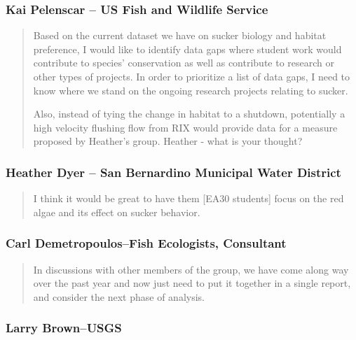 \documentclass{article}\usepackage[]{graphicx}\usepackage[]{color}
\begin{document}
\subsubsection{Kai Pelenscar -- US Fish and Wildlife Service}

\begin{quote}
Based on the current dataset we have on sucker biology and habitat preference, I would like to identify data gaps where student work would contribute to species' conservation as well as contribute to research or other types of projects. In order to prioritize a list of data gaps, I need to know where we stand on the ongoing research projects relating to sucker.

Also, instead of tying the change in habitat to a shutdown, potentially a high velocity flushing flow from RIX would provide data for a measure proposed by Heather's group. Heather - what is your thought? 
\end{quote}

\subsubsection{Heather Dyer -- San Bernardino Municipal Water District}

\begin{quote}
I think it would be great to have them [EA30 students] focus on the red algae and its effect on sucker behavior.  
\end{quote}

\subsubsection{Carl Demetropoulos--Fish Ecologists, Consultant}

\begin{quote}
In discussions with other members of the group, we have come along way over the past year and now just need to put it together in a single report, and consider the next phase of analysis.  
\end{quote}
\subsubsection{Larry Brown--USGS}
\end{document}
